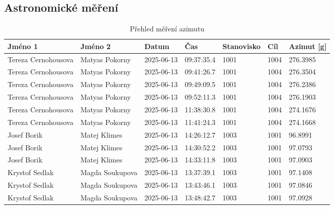 \subsection{Astronomické měření}
\begin{table}[H]
\centering
\label{tab:vysledky_mereni}
\begin{tabular}{|l|l|l|l|l|l|l|}
\hline
\textbf{Jméno 1} & \textbf{Jméno 2} & \textbf{Datum} & \textbf{Čas} & \textbf{Stanovisko} & \textbf{Cíl} & \textbf{Azimut [g]} \\
\hline
Tereza Cernohousova & Matyas Pokorny & 2025-06-13 & 09:37:35.4 & 1001 & 1004 & 276.3985 \\
\hline
Tereza Cernohousova & Matyas Pokorny & 2025-06-13 & 09:41:26.7 & 1001 & 1004 & 276.3504 \\
\hline
Tereza Cernohousova & Matyas Pokorny & 2025-06-13 & 09:49:09.5 & 1001 & 1004 & 276.2386 \\
\hline
Tereza Cernohousova & Matyas Pokorny & 2025-06-13 & 09:52:11.3 & 1001 & 1004 & 276.1903 \\
\hline
Tereza Cernohousova & Matyas Pokorny & 2025-06-13 & 11:38:30.8 & 1001 & 1004 & 274.1676 \\
\hline
Tereza Cernohousova & Matyas Pokorny & 2025-06-13 & 11:41:24.3 & 1001 & 1004 & 274.1668 \\
\hline
Josef Borik & Matej Klimes & 2025-06-13 & 14:26:12.7 & 1003 & 1001 &  96.8991 \\
\hline
Josef Borik & Matej Klimes & 2025-06-13 & 14:30:52.2 & 1003 & 1001 &  97.0793 \\
\hline
Josef Borik & Matej Klimes & 2025-06-13 & 14:33:11.8 & 1003 & 1001 &  97.0903 \\
\hline
Krystof Sedlak & Magda Soukupova & 2025-06-13 & 13:37:39.1 & 1003 & 1001 &  97.1408 \\
\hline
Krystof Sedlak & Magda Soukupova & 2025-06-13 & 13:43:46.1 & 1003 & 1001 &  97.0846 \\
\hline
Krystof Sedlak & Magda Soukupova & 2025-06-13 & 13:48:42.7 & 1003 & 1001 &  97.0928 \\
\hline
\end{tabular}
\caption{Přehled měření azimutu}
\end{table}

